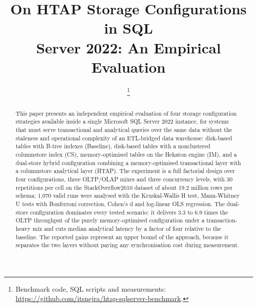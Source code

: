 \documentclass[10pt,conference,a4paper]{IEEEtran}
\begin{document}
\title{On HTAP Storage Configurations in SQL\\
Server 2022: An Empirical Evaluation}

\author{
\and
{}
%
\thanks{Benchmark code, SQL scripts and measurements:
\url{https://github.com/itsnejra/htap-sqlserver-benchmark}.}}

\maketitle
{}

\begin{abstract}
This paper presents an independent empirical evaluation of four storage
configuration strategies available inside a single Microsoft SQL Server 2022
instance, for systems that must serve transactional and analytical queries
over the same data without the staleness and operational complexity of an
ETL-bridged data warehouse: disk-based tables with B-tree indexes
(Baseline), disk-based tables with a nonclustered columnstore index (CS),
memory-optimised tables on the Hekaton engine (IM), and a dual-store hybrid
configuration combining a memory-optimised transactional layer with a
columnstore analytical layer (HTAP). The experiment is a full factorial
design over four configurations, three OLTP/OLAP mixes and three concurrency
levels, with 30 repetitions per cell on the StackOverflow2010 dataset of
about 19.2 million rows per schema; 1,070 valid runs were analysed with the
Kruskal-Wallis H test, Mann-Whitney U tests with Bonferroni correction,
Cohen's d and log-linear OLS regression. The dual-store configuration
dominates every tested scenario: it delivers 3.3 to 6.9 times the OLTP
throughput of the purely memory-optimised configuration under a
transaction-heavy mix and cuts median analytical latency by a factor of four
relative to the baseline. The reported gains represent an upper bound of the approach, because it
separates the two layers without paying any synchronisation cost during
measurement.
\end{abstract}
\end{document}
